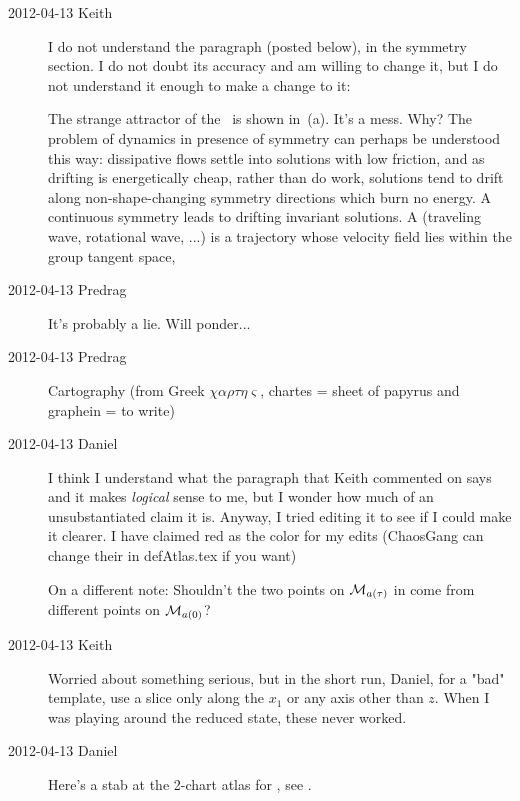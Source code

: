 \begin{description}
\item[2012-04-13 Keith] I do not understand the paragraph (posted below),
in the symmetry section.  I do not doubt its accuracy and am willing to
change it, but I do not understand it enough to make a change to it:

The strange attractor of the \cLf\ is shown in
\,(a). It's a mess. Why? The problem of dynamics
in presence of symmetry can perhaps be understood this way: dissipative
flows settle into solutions with low friction, and as drifting is
energetically cheap, rather than do work, solutions tend to drift along
non-shape-changing symmetry directions which burn no energy.
A continuous symmetry leads to drifting invariant solutions.
A {\em \reqv} (traveling wave, rotational wave, ...) is a trajectory
whose velocity field lies within the group tangent space,

\item[2012-04-13 Predrag] It's probably a lie. Will ponder...

\item[2012-04-13 Predrag]                   \toCB
Cartography (from Greek $\chi\alpha\rho\tau\eta\varsigma$, chartes =
sheet of papyrus and graphein = to write)

\item[2012-04-13 Daniel] I think I understand what the paragraph that Keith
commented on says and it makes \emph{logical} sense to me, but I wonder how
much of an unsubstantiated claim it is. Anyway, I tried editing it to see if I
could make it clearer. I have claimed red as the color for my edits (ChaosGang
can change their in defAtlas.tex if you want)

On a different note: Shouldn't the two points on ${\cal M}_{a(\tau)}$ in 
come from different points on  ${\cal M}_{a(0)}$?

\item[2012-04-13 Keith] Worried about something serious, but in the short run, Daniel, for a "bad" template, use a slice only along the $x_1$ or any axis other than $z$.  When I was playing around the reduced state, these never worked.

\item[2012-04-13 Daniel] Here's a stab at the 2-chart atlas for \CLf , see .


\end{description}
